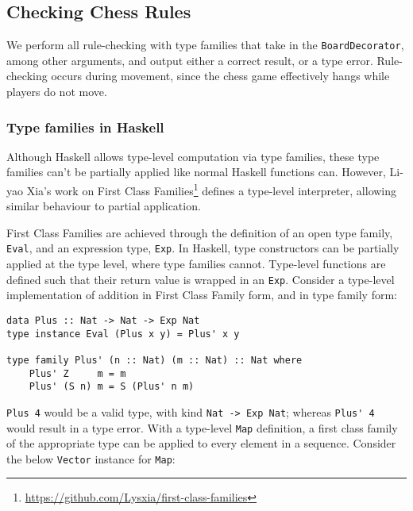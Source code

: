 \documentclass[12pt, a4paper, bibliography=totocnumbered]{scrartcl}
\begin{document}
\subsection{Checking Chess Rules}

We perform all rule-checking with type families that take in the \lstinline[basicstyle=\ttfamily]{BoardDecorator}, among other arguments, and output either a correct result, or a type error. Rule-checking occurs during movement, since the chess game effectively hangs while players do not move.

\subsubsection{Type families in Haskell}

Although Haskell allows type-level computation via type families, these type families can't be partially applied like normal Haskell functions can. However, Li-yao Xia's work on First Class Families\footnote{\url{https://github.com/Lysxia/first-class-families}} defines a type-level interpreter, allowing similar behaviour to partial application.

First Class Families are achieved through the definition of an open type family, \lstinline[basicstyle=\ttfamily]{Eval}, and an expression type, \lstinline[basicstyle=\ttfamily]{Exp}. In Haskell, type constructors can be partially applied at the type level, where type families cannot. Type-level functions are defined such that their return value is wrapped in an \lstinline[basicstyle=\ttfamily]{Exp}. Consider a type-level implementation of addition in First Class Family form, and in type family form:

\begin{lstlisting}
data Plus :: Nat -> Nat -> Exp Nat
type instance Eval (Plus x y) = Plus' x y

type family Plus' (n :: Nat) (m :: Nat) :: Nat where
    Plus' Z     m = m
    Plus' (S n) m = S (Plus' n m)
\end{lstlisting}

\lstinline[basicstyle=\ttfamily]{Plus 4} would be a valid type, with kind \lstinline[basicstyle=\ttfamily]{Nat -> Exp Nat}; whereas \lstinline[basicstyle=\ttfamily]{Plus' 4} would result in a type error. With a type-level \lstinline[basicstyle=\ttfamily]{Map} definition, a first class family of the appropriate type can be applied to every element in a sequence. Consider the below \lstinline[basicstyle=\ttfamily]{Vector} instance for \lstinline[basicstyle=\ttfamily]{Map}:
\end{document}
